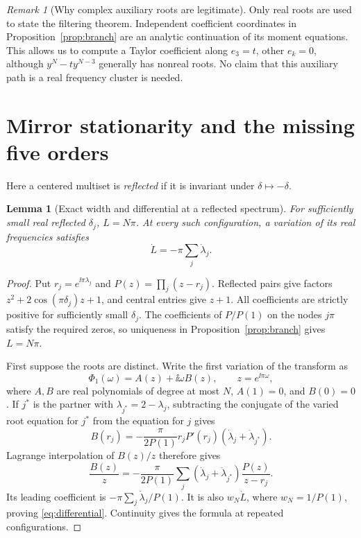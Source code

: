 \documentclass[11pt,a4paper]{article}
\newtheorem{lemma}[theorem]{Lemma}
\theoremstyle{remark}\newtheorem{remark}[theorem]{Remark}
\begin{document}
\begin{remark}[Why complex auxiliary roots are legitimate]
Only real roots are used to state the filtering theorem. Independent coefficient coordinates in Proposition~\ref{prop:branch} are an analytic continuation of its moment equations. This allows us to compute a Taylor coefficient along $e_3=t$, other $e_k=0$, although $y^N-ty^{N-3}$ generally has nonreal roots. No claim that this auxiliary path is a real frequency cluster is needed.
\end{remark}

\section{Mirror stationarity and the missing five orders}\label{sec:mirror}
Here a centered multiset is \emph{reflected} if it is invariant under $\delta\mapsto-\delta$.

\begin{lemma}[Exact width and differential at a reflected spectrum]\label{lem:mirror}
For sufficiently small real reflected $\delta_j$, $L=N\pi$. At every such configuration, a variation of its real frequencies satisfies
\begin{equation}\label{eq:differential}
 \dot L=-\pi\sum_j\dot\lambda_j.
\end{equation}
\end{lemma}
\begin{proof}
Put $r_j=e^{\ii\pi\lambda_j}$ and $P(z)=\prod_j(z-r_j)$. Reflected pairs give factors
$z^2+2\cos(\pi\delta_j)z+1$, and central entries give $z+1$. All coefficients are strictly positive for sufficiently small $\delta_j$. The coefficients of $P/P(1)$ on the nodes $j\pi$ satisfy the required zeros, so uniqueness in Proposition~\ref{prop:branch} gives $L=N\pi$.

First suppose the roots are distinct. Write the first variation of the transform as
\[
 \Phi_1(\omega)=A(z)+\ii\omega B(z),\qquad z=e^{\ii\pi\omega},
\]
where $A,B$ are real polynomials of degree at most $N$, $A(1)=0$, and $B(0)=0$. If $j^*$ is the partner with $\lambda_{j^*}=2-\lambda_j$, subtracting the conjugate of the varied root equation for $j^*$ from the equation for $j$ gives
\[
 B(r_j)=-\frac{\pi}{2P(1)}r_jP'(r_j)
               (\dot\lambda_j+\dot\lambda_{j^*}).
\]
Lagrange interpolation of $B(z)/z$ therefore gives
\[
 \frac{B(z)}z=-\frac{\pi}{2P(1)}
  \sum_j(\dot\lambda_j+\dot\lambda_{j^*})\frac{P(z)}{z-r_j}.
\]
Its leading coefficient is $-\pi\sum_j\dot\lambda_j/P(1)$. It is also $w_N\dot L$, where $w_N=1/P(1)$, proving \eqref{eq:differential}. Continuity gives the formula at repeated configurations.
\end{proof}
\end{document}

